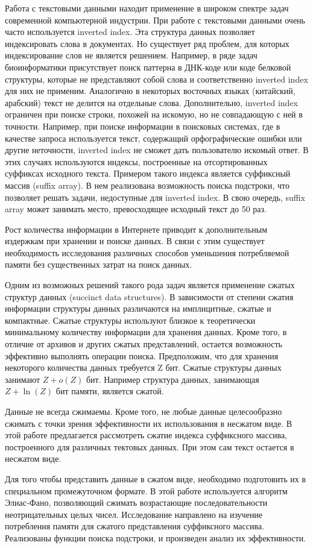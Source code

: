 

Работа с текстовыми данными находит применение в широком спектре задач современной компьютерной индустрии.
При работе с текстовыми данными очень часто используется inverted index. Эта структура данных
позволяет индексировать слова в документах. Но существует ряд проблем, для которых индексирование слов
не является решением. %
Например, в ряде задач биоинформатики присутствует поиск паттерна в ДНК-коде или коде белковой структуры,
которые не представляют собой слова и соответственно inverted index для них не применим.
Аналогично в некоторых восточных языках (китайский, арабский) текст не делится на отдельные слова.
Дополнительно, inverted index ограничен при поиске строки, похожей на искомую, но не совпадающую с ней в точности.
Например, при поиске информации в поисковых системах, где в качестве запроса используется текст, содержащий
орфографические ошибки или другие неточности, inverted index не сможет дать пользователю искомый ответ.
В этих случаях используются индексы, построенные на отсортированных суффиксах исходного текста.
Примером такого индекса является суффиксный массив (suffix array). В нем реализована возможность поиска подстроки,
что позволяет решать задачи, недоступные для inverted index. В свою очередь, suffix array может занимать
место, превосходящее исходный текст до 50 раз. %

Рост количества информации в Интернете приводит к дополнительным издержкам при хранении и поиске данных.
В связи с этим существует необходимость исследования различных способов уменьшения потребляемой памяти без
существенных затрат на поиск данных.

Одним из возможных решений такого рода задач является применение сжатых структур данных (succinct data structures).
В зависимости от степени сжатия информации структуры данных различаются на имплицитные, сжатые и компактные.
Сжатые структуры используют близкое к теоретически минимальному количеству информации для хранения данных.
Кроме того, в отличие от архивов и других сжатых представлений, остается возможность
эффективно выполнять операции поиска.
Предположим, что для хранения некоторого количества данных требуется Z бит.
Сжатые структуры данных занимают \(Z + o(Z)\) бит. Например структура данных, занимающая \(Z + \ln(Z)\) бит памяти,
является сжатой.


Данные не всегда сжимаемы. Кроме того, не любые данные целесообразно сжимать с точки зрения эффективности
их использования в несжатом виде. В этой работе предлагается рассмотреть сжатие индекса суффиксного массива,
построенного для различных тектовых данных. При этом сам текст остается в несжатом виде.


Для того чтобы представить данные в сжатом виде, необходимо подготовить их
в специальном промежуточном формате. В этой работе используется алгоритм Элиас-Фано,
позволяющий сжимать возрастающие последовательности неотрицательных целых чисел.
Исследование направлено на изучение потребления памяти для сжатого представления суффиксного массива.
Реализованы функции поиска подстроки, и произведен анализ их эффективности.

